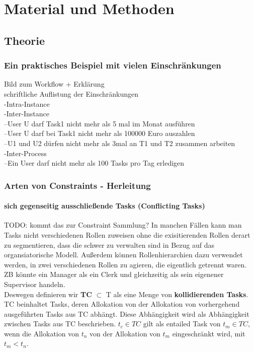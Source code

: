
\chapter{Material und Methoden} %

\label{Chapter4} %


\section{Theorie}

\subsection{Ein praktisches Beispiel mit vielen Einschränkungen}
Bild zum Workflow + Erklärung\\
schriftliche Auflistung der Einschränkungen\\
-Intra-Instance \\
-Inter-Instance\\
--User U darf Task1 nicht mehr als 5 mal im Monat ausführen\\
--User U darf bei Task1 nicht mehr als 100000 Euro auszahlen\\
--U1 und U2 dürfen nicht mehr als 3mal an T1 und T2 zusammen arbeiten\\
-Inter-Process\\
--Ein User darf nicht mehr als 100 Tasks pro Tag erledigen\\
\subsection{Arten von Constraints - Herleitung}
\subsubsection{sich gegenseitig ausschließende Tasks (Conflicting Tasks)}
TODO: kommt das zur Constraint Sammlung?
In manchen Fällen kann man Tasks nicht verschiedenen Rollen zuweisen  ohne die exisitierenden Rollen derart zu segmentieren, dass die schwer zu verwalten sind in Bezug auf das organsiatorische Modell. Außerdem können Rollenhierarchien dazu verwendet werden, in zwei verschiedenen Rollen zu agieren, die eigentlich getrennt waren. ZB könnte ein Manager als ein Clerk und gleichzeitig als sein eigenener Supervisor handeln.\\
Deswegen definieren wir \textbf{TC} $\subset$ T als eine Menge von \textbf{kollidierenden Tasks}. TC beinhaltet Tasks, deren Allokation von der Allokation von vorhergehend ausgeführten Tasks aus TC abhängt. Diese Abhängigkeit wird als Abhängigkeit zwischen Tasks aus TC beschrieben. $t_c\in TC$ gilt als entailed Task von $t_m\in TC$, wenn die Allokation von $t_n$ von der Allokation von $t_m$ eingeschränkt wird, mit $t_m<t_n$.
\cite{wolter_modeling_of_TBAC_in_BPMN}

